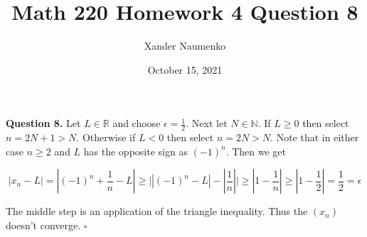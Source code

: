 \documentclass[letterpaper, reqno,11pt]{article}
\newcommand{\RR}{\mathbb{R}}
\newcommand{\NN}{\mathbb{N}}
\begin{document}
\title{Math 220 Homework 4 Question 8}
\date{October 15, 2021}
\author{Xander Naumenko}
\maketitle

{\noindent\bf Question 8.} Let $L\in\RR$ and choose $\epsilon=\frac12$. Next let $N\in\NN$. If $L\geq0$ then select $n=2N+1>N$. Otherwise if $L<0$ then select $n=2N>N$. Note that in either case $n\geq2$ and $L$ has the opposite sign as $(-1)^n$. Then we get 

$$
    |x_n-L|=|(-1)^n+\frac1n-L|\geq \bigg||(-1)^n-L|-|\frac1n|\bigg|\geq |1-\frac1n|\geq|1-\frac12|=\frac12=\epsilon
$$

The middle step is an application of the triangle inequality. Thus the $(x_n)$ doesn't converge. $\square$
\end{document}
